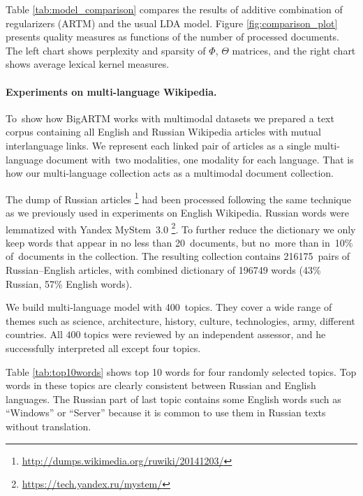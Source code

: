 \documentclass[russian,english]{llncs}
\begin{document}
Table \ref{tab:model_comparison} compares the results of additive combination of regularizers (ARTM) and the usual LDA model.
Figure \ref{fig:comparison_plot} presents quality measures as functions of the number of processed documents.
The left chart shows perplexity and sparsity of $\Phi$, $\Theta$ matrices, and
the right chart shows average lexical kernel measures.


\paragraph{Experiments on multi-language Wikipedia.}

To~show how BigARTM works with multimodal datasets we prepared a text corpus
containing all English and Russian Wikipedia articles with mutual interlanguage links.
We represent each linked pair of articles
as a single multi-language document with~two modalities, one modality for each language.
That is how our multi-language collection acts as a multimodal document collection.

The dump of Russian articles%
\footnote{\url{http://dumps.wikimedia.org/ruwiki/20141203/}}
had been processed following the same technique as we previously used in experiments on English Wikipedia.
Russian words were lemmatized with Yandex MyStem~3.0%
\footnote{\url{https://tech.yandex.ru/mystem/}}.
To further reduce the dictionary we only keep words
that appear in no less than 20~documents, but no~more than in~10\% of~documents in the collection.
The resulting collection contains 216175~pairs of Russian--English articles, with combined dictionary
of 196749 words (43\% Russian, 57\% English words).

We build multi-language model with 400~topics.
They cover a wide range of themes such as science, architecture, history, culture, technologies, army, different countries.
All $400$ topics were reviewed by an independent assessor,
and he successfully interpreted all except four topics.

Table \ref{tab:top10words} shows top 10 words for four randomly selected topics.
Top words in these topics are clearly consistent between Russian and English languages.
The Russian part of last topic contains some English words such as
``Windows'' or ``Server'' because it is common to use them in Russian texts without translation.
\end{document}
